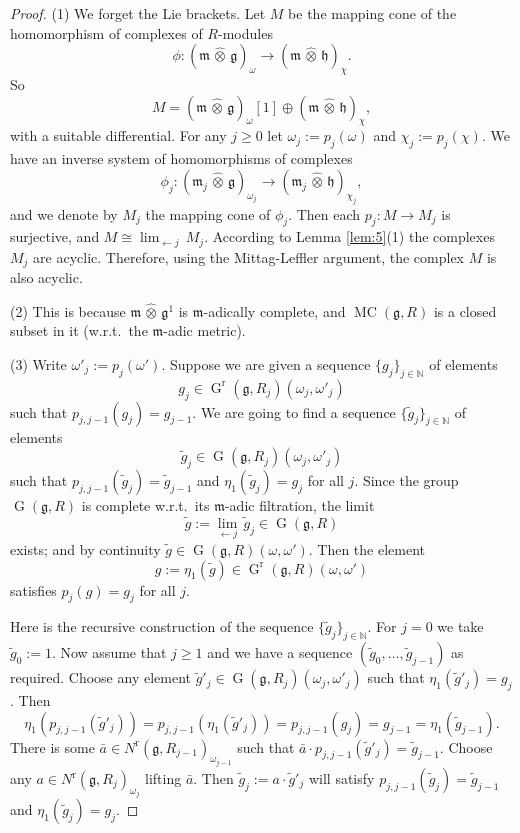 \documentclass[a4paper,10pt]{amsart}
\theoremstyle{definition}
\numberwithin{equation}{section}
\newcommand{\opn}{\operatorname}
\newcommand{\mfrak}[1]{\mathfrak{#1}}
\newcommand{\mrm}[1]{\mathrm{#1}}
\newcommand{\mbb}[1]{\mathbb{#1}}
\newcommand{\til}[1]{\tilde{#1}}
\newcommand{\what}[1]{\widehat{#1}}
\newcommand{\hatotimes}{\, \what{\otimes} \,}
\newcommand{\N}{\mbb{N}}
\newcommand{\g}{\mfrak{g}}
\newcommand{\m}{\mfrak{m}}
\newcommand{\h}{\mfrak{h}}
\newcommand{\om}{\omega}
\begin{document}
\begin{proof}
(1) We forget the Lie brackets. Let $M$ be the mapping cone of the homomorphism
of complexes of $R$-modules
\[ \phi :  (\m \hatotimes \g)_{\om} \to (\m \hatotimes \h)_{\chi} . \]
So 
\[ M = (\m \hatotimes \g)_{\om}[1] \oplus (\m \hatotimes \h)_{\chi} , \]
with a suitable differential. 
For any $j \geq 0$ let $\om_j := p_j(\om)$ and $\chi_j := p_j(\chi)$.
We have an inverse system of homomorphisms of complexes
\[ \phi_j :  (\m_j \hatotimes \g)_{\om_j} \to 
(\m_j \hatotimes \h)_{\chi_j} , \]
and we denote by $M_j$ the mapping cone of $\phi_j$.  
Then each $p_j : M \to M_j$ is surjective, and 
$M \cong \lim_{\leftarrow j}\, M_j$.
According to Lemma \ref{lem:5}(1) the complexes $M_j$ are acyclic. 
Therefore, using the Mittag-Leffler argument, the complex $M$ is also acyclic.

\medskip \noindent
(2) This is because $\m \hatotimes \g^1$ is $\m$-adically complete, and 
$\opn{MC}(\g, R)$ is a closed subset in it (w.r.t.\ the $\m$-adic metric).

\medskip \noindent
(3) Write $\om'_j := p_j(\om')$. 
Suppose we are given a sequence $\{ g_j \}_{j \in \N}$ of elements
\[ g_j \in \opn{G}^{\mrm{r}} ( \g, R_j)(\om_j, \om'_j ) \]
such that $p_{j, j-1}(g_j) = g_{j-1}$.
We are going to find a sequence $\{ \til{g}_j \}_{j \in \N}$ of elements
\[ \til{g}_j \in \opn{G} ( \g, R_j)(\om_j, \om'_j ) \]
such that $p_{j, j-1}(\til{g}_j) = \til{g}_{j-1}$
and $\eta_1(\til{g}_j) = g_j$ for all $j$.
Since the group $\opn{G}(\g, R)$ is 
complete w.r.t.\ its $\m$-adic filtration, the limit
\[ \til{g} := \lim_{\leftarrow j}\, \til{g}_j \in \opn{G}(\g, R) \]
exists; and by continuity 
$\til{g} \in \opn{G}(\g, R)(\om, \om')$.
Then the element
\[ g := \eta_1(\til{g}) \in \opn{G}^{\mrm{r}}(\g, R)(\om, \om') \]
satisfies $p_j(g) = g_j$ for all $j$.

Here is the recursive construction of the sequence 
$\{ \til{g}_j \}_{j \in \N}$.
For $j = 0$ we take $\til{g}_0 := 1$. Now assume that $j \geq 1$ and we have a 
sequence $(\til{g}_0, \ldots, \til{g}_{j-1})$ as required.
Choose any element 
$\til{g}'_j \in \opn{G}(\g, R_j)(\om_j, \om'_j)$
such that $\eta_1(\til{g}'_j) = g_j$. 
Then 
\[ \eta_1(p_{j, j-1}(\til{g}'_j)) = p_{j, j-1}(\eta_1(\til{g}'_j)) = 
p_{j, j-1}(g_j) = g_{j-1} = \eta_1(\til{g}_{j-1}) . \]
There is some $\bar{a} \in N^{\mrm{r}}(\g, R_{j-1})_{\om_{j-1}}$
such that 
$\bar{a} \cdot p_{j, j-1}(\til{g}'_j) = \til{g}_{j-1}$.
Choose any $a \in N^{\mrm{r}}(\g, R_j)_{\om_j}$
lifting $\bar{a}$. Then 
$\til{g}_j := a \cdot \til{g}'_j$ will satisfy 
$p_{j, j-1}(\til{g}_j) = \til{g}_{j-1}$ and
$\eta_1(\til{g}_j) = g_j$.
\end{proof}
\end{document}
